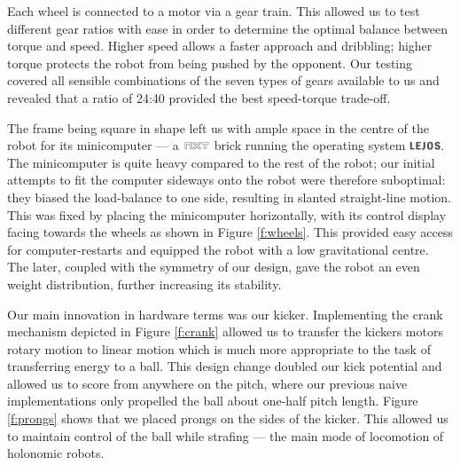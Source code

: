 \documentclass[journal,a4paper,12pt]{IEEEtran}
\newcommand*{\NXT}{\includegraphics[height=8pt]{nxt.png}\xspace}
\newcommand*{\LEJOS}{\includegraphics[height=8pt]{lejos.png}\xspace}
\begin{document}
Each wheel is connected to a motor via a gear train. This allowed us to test different gear ratios with ease in order to determine the optimal balance between torque and speed. Higher speed allows a faster approach and dribbling; higher torque protects the robot from being pushed by the opponent. Our testing covered all sensible combinations of the seven types of gears available to us and revealed that a ratio of 24:40 provided the best speed-torque trade-off.

The frame being square in shape left us with ample space in the centre of the robot for its minicomputer --- a \NXT brick running the operating system \LEJOS. The minicomputer is quite heavy compared to the rest of the robot; our initial attempts to fit the computer sideways onto the robot were therefore suboptimal: they biased the load-balance to one side, resulting in slanted straight-line motion. This was fixed by placing the minicomputer horizontally, with its control display facing towards the wheels as shown in Figure \ref{f:wheels}. This provided easy access for computer-restarts and equipped the robot with a low gravitational centre. The later, coupled with the symmetry of our design, gave the robot an even weight distribution, further increasing its stability.

Our main innovation in hardware terms was our kicker. Implementing the crank mechanism depicted in Figure \ref{f:crank} allowed us to transfer the kickers motors rotary motion to linear motion which is much more appropriate to the task of transferring energy to a ball. This design change doubled our kick potential and allowed us to score from anywhere on the pitch, where our previous naive implementations only propelled the ball about one-half pitch length. Figure \ref{f:prongs} shows that we placed prongs on the sides of the kicker. This allowed us to maintain control of the ball while strafing --- the main mode of locomotion of holonomic robots.
\end{document}
